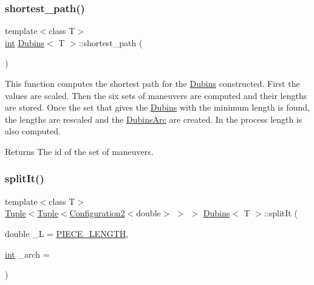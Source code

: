 \subsubsection{\texorpdfstring{shortest\_path()}{shortest\_path()}}
{\footnotesize\ttfamily template$<$class T$>$ \\
\mbox{\hyperlink{draw_8hh_aa620a13339ac3a1177c86edc549fda9b}{int}} \mbox{\hyperlink{class_dubins}{Dubins}}$<$ T $>$\+::shortest\+\_\+path (\begin{DoxyParamCaption}{ }\end{DoxyParamCaption})\hspace{0.3cm}{\ttfamily [inline]}}



This function computes the shortest path for the \mbox{\hyperlink{class_dubins}{Dubins}} constructed. First the values are scaled. Then the six sets of maneuvers are computed and their lengths are stored. Once the set that gives the \mbox{\hyperlink{class_dubins}{Dubins}} with the minimum length is found, the lengths are rescaled and the {\ttfamily \mbox{\hyperlink{class_dubins_arc}{Dubins\+Arc}}} are created. In the process length is also computed. 

\begin{DoxyReturn}{Returns}
The id of the set of maneuvers. 
\end{DoxyReturn}
\mbox{\label{class_dubins_a6ec6b08f50730585127d88f67dc31f18}} 
\subsubsection{\texorpdfstring{splitIt()}{splitIt()}}
{\footnotesize\ttfamily template$<$class T$>$ \\
\mbox{\hyperlink{class_tuple}{Tuple}}$<$\mbox{\hyperlink{class_tuple}{Tuple}}$<$\mbox{\hyperlink{class_configuration2}{Configuration2}}$<$double$>$ $>$ $>$ \mbox{\hyperlink{class_dubins}{Dubins}}$<$ T $>$\+::split\+It (\begin{DoxyParamCaption}\item[{double}]{\+\_\+L = {\ttfamily \mbox{\hyperlink{dubins_8hh_a5b2500ca93a5100f73dc442d3cfea7d4}{P\+I\+E\+C\+E\+\_\+\+L\+E\+N\+G\+TH}}},  }\item[{\mbox{\hyperlink{draw_8hh_aa620a13339ac3a1177c86edc549fda9b}{int}}}]{\+\_\+arch = {} }\end{DoxyParamCaption})\hspace{0.3cm}{\ttfamily [inline]}}

